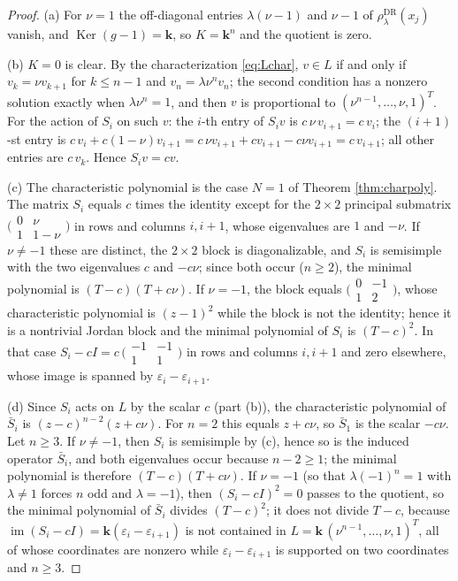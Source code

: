 \documentclass[11pt]{article}
\theoremstyle{definition}
\theoremstyle{remark}
\newcommand{\Ker}{\operatorname{Ker}}
\newcommand{\kk}{\boldsymbol{k}}
\newcommand{\rDR}{\rho^{\mathrm{DR}}_{\lambda}}
\begin{document}
\begin{proof}
(a) For $\nu = 1$ the off-diagonal entries $\lambda(\nu - 1)$ and
$\nu - 1$ of $\rDR(x_j)$ vanish, and $\Ker(g - 1) = \kk$, so
$K = \kk^n$ and the quotient is zero.

(b) $K = 0$ is clear. By the characterization \eqref{eq:Lchar}, $v \in L$
if and only if $v_k = \nu v_{k+1}$ for $k \le n-1$ and
$v_n = \lambda \nu^n v_n$; the second condition has a nonzero solution
exactly when $\lambda \nu^n = 1$, and then $v$ is proportional to
$(\nu^{n-1}, \dots, \nu, 1)^{T}$. For the action of $S_i$ on such $v$:
the $i$-th entry of $S_i v$ is $c\,\nu\, v_{i+1} = c\, v_i$; the
$(i{+}1)$-st entry is
$c\, v_i + c(1 - \nu)v_{i+1} = c\,\nu v_{i+1} + c v_{i+1} - c\nu v_{i+1}
= c\, v_{i+1}$; all other entries are $c\, v_k$. Hence $S_i v = c v$.

(c) The characteristic polynomial is the case $N = 1$ of Theorem
\ref{thm:charpoly}. The matrix $S_i$ equals $c$ times the identity except
for the $2 \times 2$ principal submatrix
$\bigl(\begin{smallmatrix} 0 & \nu \\ 1 & 1 - \nu \end{smallmatrix}\bigr)$
in rows and columns $i, i+1$, whose eigenvalues are $1$ and $-\nu$. If
$\nu \neq -1$ these are distinct, the $2 \times 2$ block is
diagonalizable, and $S_i$ is semisimple with the two eigenvalues $c$ and
$-c\nu$; since both occur ($n \geq 2$), the minimal polynomial is
$(T - c)(T + c\nu)$. If $\nu = -1$, the block equals
$\bigl(\begin{smallmatrix} 0 & -1 \\ 1 & 2 \end{smallmatrix}\bigr)$, whose
characteristic polynomial is $(z - 1)^2$ while the block is not the
identity; hence it is a nontrivial Jordan block and the minimal polynomial
of $S_i$ is $(T - c)^2$. In that case
$S_i - cI = c\,\bigl(\begin{smallmatrix} -1 & -1 \\ 1 & 1
\end{smallmatrix}\bigr)$ in rows and columns $i, i+1$ and zero
elsewhere, whose image is spanned by $\varepsilon_i - \varepsilon_{i+1}$.

(d) Since $S_i$ acts on $L$ by the scalar $c$ (part (b)), the
characteristic polynomial of $\bar S_i$ is
$(z - c)^{n-2}(z + c\nu)$. For $n = 2$ this equals $z + c\nu$, so
$\bar S_1$ is the scalar $-c\nu$. Let $n \geq 3$. If $\nu \neq -1$,
then $S_i$ is semisimple by (c), hence so is the induced operator
$\bar S_i$, and both eigenvalues occur because $n - 2 \geq 1$; the
minimal polynomial is therefore $(T - c)(T + c\nu)$. If $\nu = -1$
(so that $\lambda(-1)^n = 1$ with $\lambda \neq 1$ forces $n$ odd and
$\lambda = -1$), then $(S_i - cI)^2 = 0$ passes to the quotient, so
the minimal polynomial of $\bar S_i$ divides $(T - c)^2$; it does not
divide $T - c$, because
$\operatorname{im}(S_i - cI) = \kk(\varepsilon_i - \varepsilon_{i+1})$
is not contained in $L = \kk\,(\nu^{n-1}, \dots, \nu, 1)^{T}$, all of
whose coordinates are nonzero while $\varepsilon_i - \varepsilon_{i+1}$
is supported on two coordinates and $n \geq 3$.
\end{proof}
\end{document}
